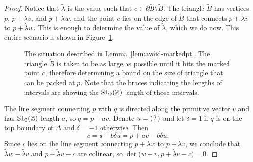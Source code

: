\documentclass[10pt,a4paper]{amsart}
\numberwithin{equation}{section}
\newenvironment{psmallmatrix}
 {\left(\begin{smallmatrix}}
 {\end{smallmatrix}\right)}
\newcommand{\triangleline}{dashed}
\def\Z{{\mathbb Z}}
\newcommand{\De}{\Delta}
\newcommand{\SL}{{\rm SL}_2(\Z)}
\newcommand{\vect}[2]{\begin{psmallmatrix} #1 \\ #2 \end{psmallmatrix}}
\theoremstyle{definition}
\theoremstyle{plain}
\theoremstyle{plain}
\begin{document}
\begin{proof}
Notice that $\widetilde{\lambda}$ is the value such that
$c\in\partial \widetilde{B}\setminus\widetilde{B}$.
The triangle $\widetilde{B}$ has vertices $p$, $p+\widetilde{\lambda} v$, and $p+\widetilde{\lambda}w$, and the point $c$ lies on the edge of $\widetilde{B}$ that connects $p+\widetilde{\lambda} v$ to $p+\widetilde{\lambda}w$. This is enough to determine the value of $\widetilde{\lambda}$, which we do now.
This entire scenario is shown in Figure~\ref{fig:one_cut}.

\begin{figure}[t]
\begin{center}
 \caption{The situation described in Lemma~\ref{lem:avoid-markedpt}. The triangle $\widetilde{B}$ is taken to be as large as possible until it hits the marked point $c$, therefore determining a bound on the size of triangle that can be packed at $p$. Note that the braces indicating the lengths of intervals are showing the $\SL$-length of those intervals.} \label{fig:one_cut}
 \end{center}
\end{figure}

The line segment connecting $p$ with $q$ is directed along the primitive vector $v$ and has $\SL$-length $a$, so $q = p+av$.
Denote $u = \vect{0}{1}$ and let $\delta = 1$ if $q$ is on the top boundary of $\De$ and $\delta = -1$ otherwise. Then
\[
 c = q-b\delta u = p+av - b\delta u.
\]
Since $c$ lies on the line segment connecting $p+\widetilde{\lambda}w$ to $p+\widetilde{\lambda}v$, we conclude that $\widetilde{\lambda}w - \widetilde{\lambda}v$ and $p+\widetilde{\lambda}v-c$ are colinear, so $\det\big(w-v, p+\widetilde{\lambda}v-c\big)=0$.


\end{proof}
\end{document}
